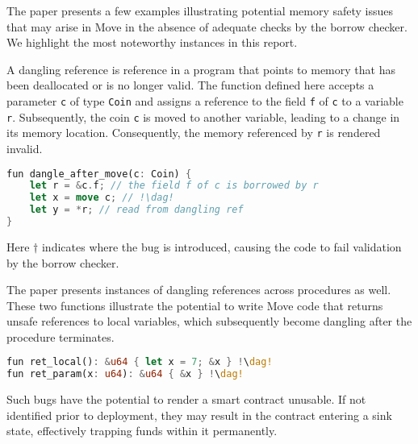 The paper presents a few examples illustrating potential memory safety issues that may arise in Move in the absence of adequate checks by the borrow checker. We highlight the most noteworthy instances in this report.

A dangling reference is reference in a program that points to memory that has been deallocated or is no longer valid.
The function defined here accepts a parameter \texttt{c} of type \texttt{Coin} and assigns a reference to the field \texttt{f} of \texttt{c} to a variable \texttt{r}. Subsequently, the coin \texttt{c} is moved to another variable, leading to a change in its memory location. Consequently, the memory referenced by \texttt{r} is rendered invalid.

\begin{lstlisting}[escapechar=!, language=Rust]
fun dangle_after_move(c: Coin) {
    let r = &c.f; // the field f of c is borrowed by r
    let x = move c; // !\dag!
    let y = *r; // read from dangling ref
}
\end{lstlisting}


Here $\dag$ indicates where the bug is introduced, causing the code to fail validation by the borrow checker.

The paper presents instances of dangling references across procedures as well. These two functions illustrate the potential to write Move code that returns unsafe references to local variables, which subsequently become dangling after the procedure terminates.

\begin{lstlisting}[escapechar=!, language=Rust]
fun ret_local(): &u64 { let x = 7; &x } !\dag!
fun ret_param(x: u64): &u64 { &x } !\dag!
\end{lstlisting}

Such bugs have the potential to render a smart contract unusable. If not identified prior to deployment, they may result in the contract entering a sink state, effectively trapping funds within it permanently.
